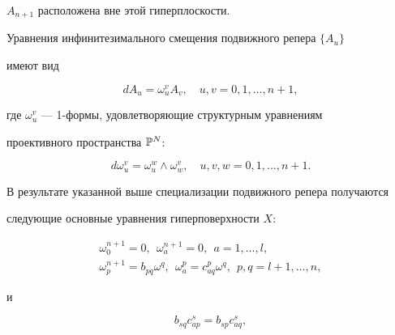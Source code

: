 $A_{n+1}$ расположена вне этой гиперплоскости.





Уравнения инфинитезимального смещения подвижного репера $\{A_u\}$


имеют вид


$$




dA_u = \omega_u^v A_v, \quad u, v = 0, 1, \dotsc , n + 1,




$$


где $\omega_u^v$ --- 1-формы, удовлетворяющие структурным уравнениям


проективного пространства ${\Bbb P}^N$:


$$




d \omega_u^v = \omega_u^w \wedge \omega_w^v,


\quad u, v, w = 0, 1, \dotsc , n + 1.




$$





В результате указанной выше специализации подвижного репера получаются


следующие основные уравнения гиперповерхности  $X$:


\begin{gather}\label{eq:3}


\omega_0^{n+1} = 0, \ \  \omega^{n+1}_a = 0, \ \ a = 1,\dotsc, l, \\


%


\label{eq:4}


\omega_p^{n+1} = b_{pq} \omega^q, \ \   \omega_a^p = c_{aq}^p \omega^q,


\ \ p,q=l+1, \dotsc, n,


\end{gather}


и


\begin{equation}\label{eq:5}


b_{sq} c^s_{ap} = b_{sp} c^s_{aq},


\end{equation}



